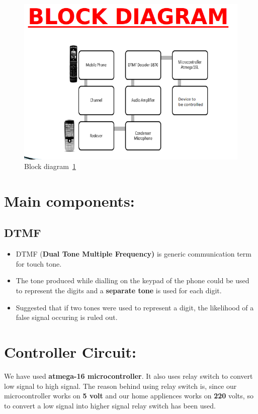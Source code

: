 \documentclass[11pt]{article}
\begin{document}
\begin{figure}[h]
\begin{center}
\includegraphics[scale=0.33]{blockdiag.png}
\caption{\label{fig:vaquois} Block diagram~\ref{fig:vaquois}}
\end{center}
\end{figure}

\section{Main components:}
\subsection{DTMF}
\begin{itemize}
\item{	DTMF (\textbf{Dual Tone Multiple Frequency)} is generic communication term for touch tone.
}
\end{itemize}
\begin{itemize}
	\item{
	The tone produced while dialling on the keypad of the phone could be used to represent the digits and a \textbf{separate tone} is used for each digit.
}
\end{itemize}
\begin{itemize}
	\item{
	Suggested that if two tones were used to represent a digit, the likelihood of a false signal occuring is ruled out.}
\end{itemize}
	
\section{Controller Circuit:}
	We have used \textbf{atmega-16 microcontroller}. It also uses relay switch to convert low signal to high signal. The reason behind using relay switch is, since our microcontroller works on \textbf{5 volt} and our home appliences works on \textbf{220} volts, so to convert a low signal into higher signal relay switch has been used. 
\end{document}
